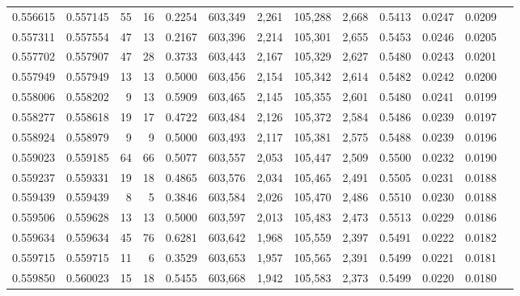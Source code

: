 \begin{tabular}{rrrrrrrrrrrrr}
0.556615 & 0.557145 &    55 &    16 &                                     0.2254 & 603,349 &   2,261 & 105,288 &   2,668 & 0.5413 & 0.0247 & 0.0209 \\
0.557311 & 0.557554 &    47 &    13 &                                     0.2167 & 603,396 &   2,214 & 105,301 &   2,655 & 0.5453 & 0.0246 & 0.0205 \\
0.557702 & 0.557907 &    47 &    28 &                                     0.3733 & 603,443 &   2,167 & 105,329 &   2,627 & 0.5480 & 0.0243 & 0.0201 \\
0.557949 & 0.557949 &    13 &    13 &                                     0.5000 & 603,456 &   2,154 & 105,342 &   2,614 & 0.5482 & 0.0242 & 0.0200 \\
0.558006 & 0.558202 &     9 &    13 &                                     0.5909 & 603,465 &   2,145 & 105,355 &   2,601 & 0.5480 & 0.0241 & 0.0199 \\
0.558277 & 0.558618 &    19 &    17 &                                     0.4722 & 603,484 &   2,126 & 105,372 &   2,584 & 0.5486 & 0.0239 & 0.0197 \\
0.558924 & 0.558979 &     9 &     9 &                                     0.5000 & 603,493 &   2,117 & 105,381 &   2,575 & 0.5488 & 0.0239 & 0.0196 \\
0.559023 & 0.559185 &    64 &    66 &                                     0.5077 & 603,557 &   2,053 & 105,447 &   2,509 & 0.5500 & 0.0232 & 0.0190 \\
0.559237 & 0.559331 &    19 &    18 &                                     0.4865 & 603,576 &   2,034 & 105,465 &   2,491 & 0.5505 & 0.0231 & 0.0188 \\
0.559439 & 0.559439 &     8 &     5 &                                     0.3846 & 603,584 &   2,026 & 105,470 &   2,486 & 0.5510 & 0.0230 & 0.0188 \\
0.559506 & 0.559628 &    13 &    13 &                                     0.5000 & 603,597 &   2,013 & 105,483 &   2,473 & 0.5513 & 0.0229 & 0.0186 \\
0.559634 & 0.559634 &    45 &    76 &                                     0.6281 & 603,642 &   1,968 & 105,559 &   2,397 & 0.5491 & 0.0222 & 0.0182 \\
0.559715 & 0.559715 &    11 &     6 &                                     0.3529 & 603,653 &   1,957 & 105,565 &   2,391 & 0.5499 & 0.0221 & 0.0181 \\
0.559850 & 0.560023 &    15 &    18 &                                     0.5455 & 603,668 &   1,942 & 105,583 &   2,373 & 0.5499 & 0.0220 & 0.0180 \\

\end{tabular}
